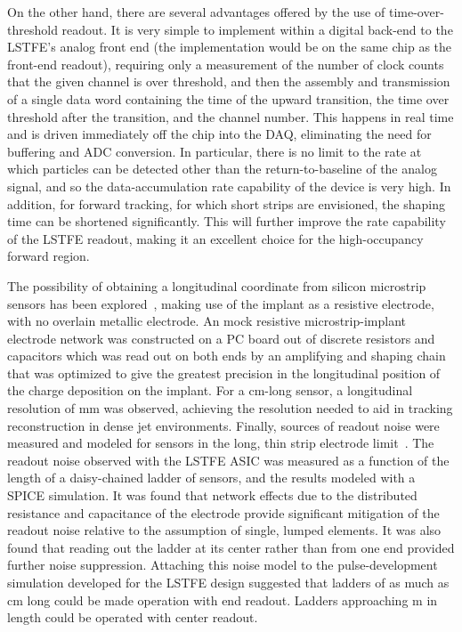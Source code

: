 On the other hand, there are several advantages offered by the use of time-over-threshold readout. It is very simple
to implement within a digital back-end to the LSTFE's analog front end (the implementation would be on the same chip
as the front-end readout), requiring only a measurement of the number of clock counts that the given channel is over
threshold, and then the assembly and transmission of a
single data word containing the time of the upward transition, the time over threshold after the transition, and the
channel number. This happens in real time and is driven immediately off the chip into the DAQ, eliminating the need
for buffering and ADC conversion. In particular, there is no limit to the rate at which particles can be detected
other than the return-to-baseline of the analog signal, and so the data-accumulation rate capability of the device
is very high. In addition, for forward tracking, for which short strips are envisioned, the shaping time can be
shortened significantly. This will further improve the rate capability of the LSTFE readout, making it an excellent
choice for the high-occupancy forward region.
%

The possibility of obtaining a longitudinal coordinate from silicon
microstrip sensors has been explored~\cite{Carman2011118}, making use of the
implant as a resistive electrode, with no overlain metallic electrode. An mock resistive
microstrip-implant electrode network was constructed on a PC board out of discrete resistors and capacitors
which was read out on both ends by an amplifying and shaping chain that was optimized to give the greatest
precision in the longitudinal position of the charge deposition on the implant. For a \unit[10]{cm}-long sensor,
a longitudinal resolution of \unit[6]{mm} was observed, achieving the resolution needed to aid in tracking
reconstruction in dense jet environments. Finally, sources of readout noise were measured and modeled
for sensors in the long, thin strip electrode limit~\cite{Collier2013127}. The readout noise observed
with the LSTFE ASIC was measured as a function of the length of a daisy-chained ladder of sensors,
and the results modeled with a SPICE simulation. It was found that network effects due to the
distributed resistance and capacitance of the electrode provide significant
mitigation of the readout noise relative to the assumption of single, lumped elements. It
was also found that reading out the ladder at its center rather than from one end provided
further noise suppression. Attaching this noise model to the pulse-development simulation
developed for the LSTFE design suggested that ladders of as much as \unit[75]{cm} long could be
made operation with end readout. Ladders approaching \unit[1]{m} in length could be operated with center readout.

